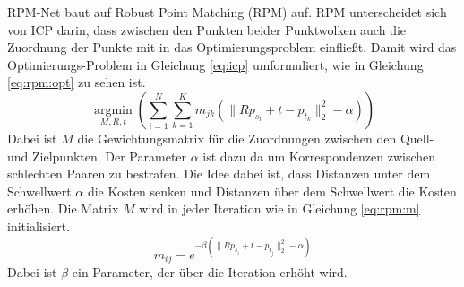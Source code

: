 \documentclass[12pt,titlepage, twoside]{article}
\begin{document}

RPM-Net baut auf Robust Point Matching (RPM) \cite{RPM} auf. RPM unterscheidet sich von ICP darin, dass zwischen den Punkten beider Punktwolken auch die Zuordnung der Punkte mit in das Optimierungsproblem einfließt.
Damit wird das Optimierungs-Problem in Gleichung \ref{eq:icp} umformuliert, wie in Gleichung \ref{eq:rpm:opt} zu sehen ist.
\begin{equation}
    \label{eq:rpm:opt}
    \underset{M,R,t}{\operatorname{argmin}}(\sum_{i=1}^N\sum_{k=1}^K{m_{jk}(\|Rp_{s_i} + t - p_{t_k}\|_2^2-\alpha)})
\end{equation}
Dabei ist $M$ die Gewichtungsmatrix für die Zuordnungen zwischen den Quell- und Zielpunkten. Der Parameter $\alpha$ ist dazu da um Korrespondenzen zwischen schlechten Paaren zu bestrafen. 
Die Idee dabei ist, dass Distanzen unter dem Schwellwert $\alpha$ die Kosten senken und Distanzen über dem Schwellwert die Kosten erhöhen.
Die Matrix $M$ wird in jeder Iteration wie in Gleichung \ref{eq:rpm:m} initialisiert.
\begin{equation}
    \label{eq:rpm:m}
    m_{ij} = e^{-\beta(\|Rp_{s_i} + t - p_{t_j}\|_2^2-\alpha)}
\end{equation}
Dabei ist $\beta$ ein Parameter, der über die Iteration erhöht wird.
\end{document}
